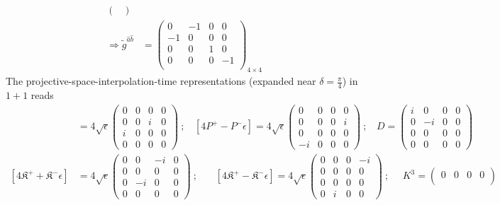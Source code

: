 \documentclass[]{article}
\numberwithin{equation}{section}
\begin{document}
{{\begin{align}
\begin{pmatrix}
    \end{pmatrix}\\
    \Longrightarrow\tilde{g}^{\hat{a}\hat{b}}&=\begin{pmatrix}
  0&-1&0&0\\
  -1&0&0&0\\
  0&0&1&0\\
  0&0&0&-1\\
  \end{pmatrix}_{4\times4}
\end{align}
The projective-space-interpolation-time representations (expanded near $\delta=\frac{\pi}{4}$) in $1+1$ reads
\begin{align}
    [4P^{{+}}+P^{-}\epsilon]&=4\sqrt{\epsilon}\begin{pmatrix}
        0&0&0&0\\
        0&0&i&0\\
        i&0&0&0\\
        0&0&0&0
    \end{pmatrix}~;~~~~[4P^{{+}}-P^{-}\epsilon]=4\sqrt{\epsilon}\begin{pmatrix}
        0&0&0&0\\
        0&0&0&i\\
        0&0&0&0\\
        -i&0&0&0
    \end{pmatrix}~;~~~~D=\begin{pmatrix}
        i&0&0&0\\
        0&-i&0&0\\
        0&0&0&0\\
        0&0&0&0
    \end{pmatrix}\nonumber\\
    [4\mathfrak{K}^{+}+\mathfrak{K}^{-}\epsilon]&=4\sqrt{\epsilon}\begin{pmatrix}
        0&0&-i&0\\
        0&0&0&0\\
        0&-i&0&0\\
        0&0&0&0
    \end{pmatrix}~;~~~~~~~~[4\mathfrak{K}^{+}-\mathfrak{K}^{-}\epsilon]=4\sqrt{\epsilon}\begin{pmatrix}
        0&0&0&-i\\
        0&0&0&0\\
        0&0&0&0\\
        0&i&0&0
    \end{pmatrix}~;~~~~~~K^{3}=\begin{pmatrix}
        0&0&0&0\\

\end{pmatrix}
\end{align}}}
\end{document}
